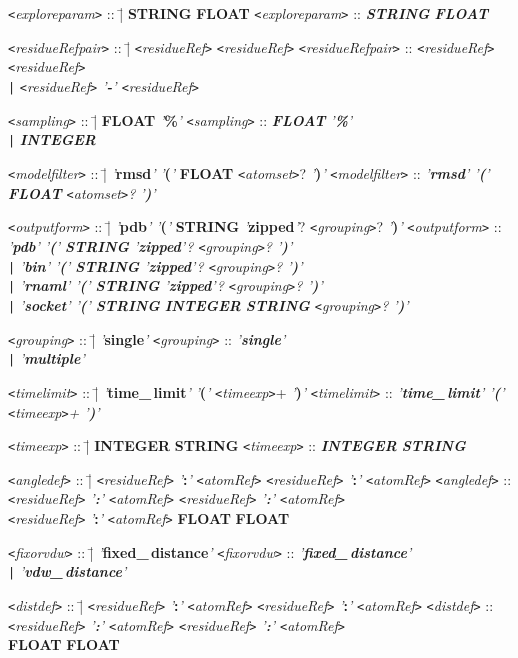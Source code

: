\documentclass[11pt]{article}
\newcommand{\keyword}[1]{{\rm {\tt <}{\em #1}{\tt >}}}
\newcommand{\nonterminal}[1]{{\rm {\tt <}{\em #1}{\tt >}}}
\newcommand{\terminal}[1]{{\em '}{\bf #1}{\em '}}
\newcommand{\token}[1]{{\bf #1}}
\newenvironment{grammarrule}[2]{\begin{tabbing}
    \keyword{#1} :: \= | \= #2 \kill
    \keyword{#1} :: \> \> {\em #2} \\}
  {\end{tabbing}}
\newenvironment{biggrammarrule}[3]{\begin{tabbing}
    \keyword{#1} :: \= | \= #2 \kill
    \keyword{#1} :: \> \> {\em #2} \\
    \> \> #3 \\}
  {\end{tabbing}}
\newcommand{\altrule}[1]{\> {\tt |} \> {\em #1} \\}
\begin{document}
\begin{grammarrule}{exploreparam}{\token{STRING} \token{FLOAT}}
\end{grammarrule}
\begin{grammarrule}{residueRefpair}{\nonterminal{residueRef}
    \nonterminal{residueRef}}
  \altrule{\nonterminal{residueRef} \terminal{-} \nonterminal{residueRef}}
\end{grammarrule}
\begin{grammarrule}{sampling}{\token{FLOAT} \terminal{\%}}
  \altrule{\token{INTEGER}}
\end{grammarrule}
\begin{grammarrule}{modelfilter}{\terminal{rmsd} \terminal{(}
    \token{FLOAT} \nonterminal{atomset}? \terminal{)}}
\end{grammarrule}
\begin{grammarrule}{outputform}{\terminal{pdb} \terminal{(}
    \token{STRING} \terminal{zipped}? \nonterminal{grouping}? \terminal{)}}
  \altrule{\terminal{bin} \terminal{(} \token{STRING}
    \terminal{zipped}? \nonterminal{grouping}? \terminal{)}}
  \altrule{\terminal{rnaml} \terminal{(} \token{STRING}
    \terminal{zipped}? \nonterminal{grouping}? \terminal{)}}
  \altrule{\terminal{socket} \terminal{(} \token{STRING}
    \token{INTEGER} \token{STRING} \nonterminal{grouping}? \terminal{)}}
\end{grammarrule}
\begin{grammarrule}{grouping}{\terminal{single}}
  \altrule{\terminal{multiple}}
\end{grammarrule}
\begin{grammarrule}{timelimit}{\terminal{time\_\,limit} \terminal{(}
    \nonterminal{timeexp}+ \terminal{)}}
\end{grammarrule}
\begin{grammarrule}{timeexp}{\token{INTEGER} \token{STRING}}
\end{grammarrule}
\begin{biggrammarrule}{angledef}
  {\nonterminal{residueRef} \terminal{:} \nonterminal{atomRef}
    \nonterminal{residueRef} \terminal{:} \nonterminal{atomRef}}
  {\nonterminal{residueRef} \terminal{:} \nonterminal{atomRef} \token{FLOAT}
    \token{FLOAT}}
\end{biggrammarrule}
\begin{grammarrule}{fixorvdw}{\terminal{fixed\_\,distance}}
  \altrule{\terminal{vdw\_\,distance}}
\end{grammarrule}
\begin{biggrammarrule}{distdef}
  {\nonterminal{residueRef} \terminal{:} \nonterminal{atomRef}
    \nonterminal{residueRef} \terminal{:} \nonterminal{atomRef}}
  {\token{FLOAT} \token{FLOAT}}
\end{biggrammarrule}
\end{document}

